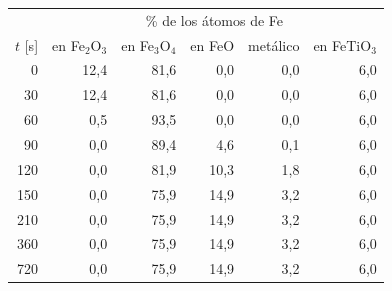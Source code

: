 \begin{tabular}{rrrrrr}
    \hline
     & \multicolumn{5}{c}{\% de los átomos de Fe} \\
    $t$ [s] & en Fe$_2$O$_3$ & en Fe$_3$O$_4$ & en FeO & metálico & en FeTiO$_3$ \\
    \hline
    0 & 12,4 & 81,6 & 0,0 & 0,0 & 6,0 \\
    30 & 12,4 & 81,6 & 0,0 & 0,0 & 6,0 \\
    60 & 0,5 & 93,5 & 0,0 & 0,0 & 6,0 \\
    90 & 0,0 & 89,4 & 4,6 & 0,1 & 6,0 \\
    120 & 0,0 & 81,9 & 10,3 & 1,8 & 6,0 \\
    150 & 0,0 & 75,9 & 14,9 & 3,2 & 6,0 \\
    210 & 0,0 & 75,9 & 14,9 & 3,2 & 6,0 \\
    360 & 0,0 & 75,9 & 14,9 & 3,2 & 6,0 \\
    720 & 0,0 & 75,9 & 14,9 & 3,2 & 6,0 \\
    \hline
\end{tabular}
